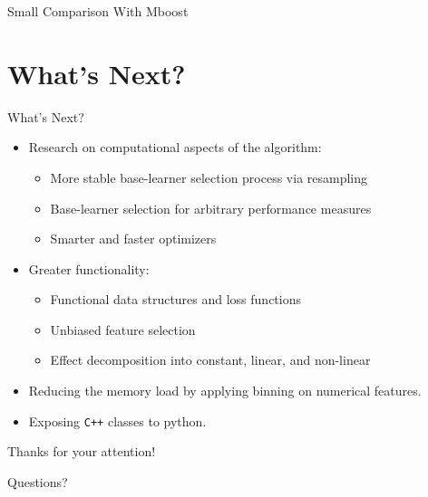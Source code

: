 \documentclass[10pt]{beamer}\usepackage[]{graphicx}\usepackage[]{color}
\begin{document}
\begin{frame}{Small Comparison With Mboost}
\end{frame}


\section{What's Next?}

\begin{frame}{What's Next?}

\begin{itemize}
  \item
    Research on computational aspects of the algorithm:
    \begin{itemize}
      \item
        More stable base-learner selection process via resampling
      \item
        Base-learner selection for arbitrary performance measures
      \item
        Smarter and faster optimizers
    \end{itemize}

  \item
    Greater functionality:
    \begin{itemize}
      \item
        Functional data structures and loss functions
      \item
        Unbiased feature selection
      \item
        Effect decomposition into constant, linear, and non-linear
    \end{itemize}

    \item
      Reducing the memory load by applying binning on numerical features.

    \item
      Exposing \texttt{C++} classes to python.
\end{itemize}

\end{frame}

\addtocounter{framenumber}{-1}

\begin{frame}
  Thanks for your attention!

  Questions?
\end{frame}
\end{document}
